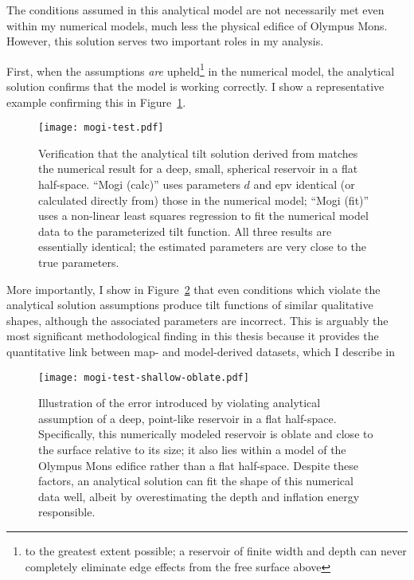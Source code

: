 The conditions assumed in this analytical model are not necessarily met even within my numerical models, much less the physical edifice of Olympus Mons. However, this solution serves two important roles in my analysis. 

First, when the assumptions \emph{are} upheld\footnote{to the greatest extent possible; a reservoir of finite width and depth can never completely eliminate edge effects from the free surface above} in the numerical model, the analytical solution confirms that the model is working correctly. I show a representative example confirming this in Figure~\ref{fig:mogi-test}.

\begin{figure}
    \texttt{[image: mogi-test.pdf]}%
    \caption[Analytical solution verification]{Verification that the analytical tilt solution derived from \textcite{mogi_relations_1958} matches the numerical result for a deep, small, spherical reservoir in a flat half-space. ``Mogi (calc)'' uses parameters $d$ and \acs{epv} identical (or calculated directly from) those in the numerical model; ``Mogi (fit)'' uses a non-linear least squares regression to fit the numerical model data to the parameterized tilt function. All three results are essentially identical; the estimated parameters are very close to the true parameters.}%
    \label{fig:mogi-test}
\end{figure}

More importantly, I show in Figure~\ref{fig:mogi-test-shallow-oblate} that even conditions which violate the analytical solution assumptions produce tilt functions of similar qualitative shapes, although the associated parameters are incorrect. This is arguably the most significant methodological finding in this thesis because it provides the quantitative link between map- and model-derived datasets, which I describe in 

\begin{figure}
    \texttt{[image: mogi-test-shallow-oblate.pdf]}%
    \caption[Analytical model sensitivity to reservoir geometry]{Illustration of the error introduced by violating analytical assumption of a deep, point-like reservoir in a flat half-space. Specifically, this numerically modeled reservoir is oblate and close to the surface relative to its size; it also lies within a model of the Olympus Mons edifice rather than a flat half-space. Despite these factors, an analytical solution can fit the shape of this numerical data well, albeit by overestimating the depth and inflation energy responsible.}%
    \label{fig:mogi-test-shallow-oblate}
\end{figure}
